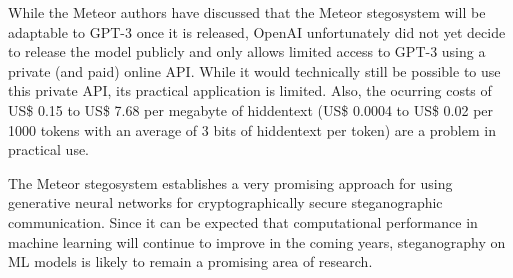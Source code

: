 While the Meteor authors have discussed that the Meteor stegosystem will be adaptable to GPT-3 once it is released, OpenAI unfortunately did not yet decide to release the model publicly and only allows limited access to GPT-3 using a private (and paid) online API.
While it would technically still be possible to use this private API, its practical application is limited.
Also, the ocurring costs of US\$ 0.15 to US\$ 7.68 per megabyte of hiddentext (US\$ 0.0004 to US\$ 0.02 per 1000 tokens with an average of 3 bits of hiddentext per token) are a problem in practical use.

The Meteor stegosystem establishes a very promising approach for using generative neural networks for cryptographically secure steganographic communication.
Since it can be expected that computational performance in machine learning will continue to improve in the coming years, steganography on ML models is likely to remain a promising area of research.
